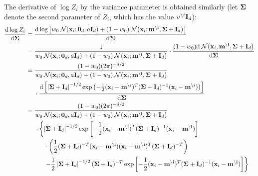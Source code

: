 \documentclass[11pt]{article}
\begin{document}
The derivative of $\log Z_i$ by the variance parameter is obtained 
similarly (let $\mathbf{\Sigma}$ denote the second parameter of $Z_i$, which has 
the value $v^{\setminus i}\mathbf{I}_d$):
\begin{align}
\frac{\byd \log Z_i}{\byd \vek{\Sigma}} &=
			\frac{\byd \log\left[ w_0  \norm(\vek{x}_i; \vek{0}_d, a\unity_{d})
			+  (1 - w_0)\norm\!\left(\vek{x}_i; \vek{m^{\setminus i}}, \vek{\Sigma} 
			+ \unity_d\right)
			\right]}{\byd \vek{\Sigma}} \\
			&=
			\frac{1}{w_0  \norm(\vek{x}_i; \vek{0}_d, a\unity_{d})
			+  (1 - w_0)\norm\!\left(\vek{x}_i; \vek{m^{\setminus i}}, \vek{\Sigma} 
			+ \unity_d\right)
			}%
			\cdot
			\frac{(1 - w_0)\byd
			\norm\!\left(\vek{x}_i; \vek{m^{\setminus i}}, \vek{\Sigma} + \unity_d\right)
			}{\byd \vek{\Sigma}} \\
			&=
			\frac{(1 - w_0)
				(2\pi)^{-d/2}}
			{w_0  \norm(\vek{x}_i; \vek{0}_d, a\unity_{d})
			+  (1 - w_0)\norm\!\left(\vek{x}_i; \vek{m^{\setminus i}}, \vek{\Sigma} 
			+ \unity_d\right)
			}\notag\\
		&\hphantom{=|}\mbox{}
			\cdot
			\frac{
			\byd\left[
			\left|\vek{\Sigma} + \unity_d\right|^{-1/2}
			\exp\left(-\frac{1}{2}
				(\vek{x}_i - \vek{m}^{\setminus i})^T
				(\vek{\Sigma} + \unity_d)^{-1}
				(\vek{x}_i - \vek{m}^{\setminus i})\right)\right]}
				{\byd \vek{\Sigma}} \\
			&=
			\frac{(1 - w_0)
				(2\pi)^{-d/2}}
			{w_0  \norm(\vek{x}_i; \vek{0}_d, a\unity_{d})
			+  (1 - w_0)\norm\!\left(\vek{x}_i; \vek{m^{\setminus i}}, \vek{\Sigma} 
			+ \unity_d\right)
			}\notag\\
			&\hphantom{=|}\mbox{}\cdot\left\{
     \left|\vek{\Sigma} + \unity_d\right|^{-1/2}%
						\exp\left[-\frac{1}{2}(\vek{x}_i - \vek{m^{\setminus 
				i}})^T(\vek{\Sigma} + \unity_d)^{-1}(\vek{x}_i - \vek{m^{\setminus 
				i}})\right]\right.\notag\\%
			&\hphantom{=|\cdot\Bigg\{}\mbox{}
				\cdot\left(\frac{1}{2}(\vek{\Sigma} + \unity_d)^{-T}(\vek{x}_i - \vek{m^{\setminus 
				i}})(\vek{x}_i - \vek{m^{\setminus i}})^T(\vek{\Sigma} + \unity_d)^{-T}\right)
				\notag\\
			&\hphantom{=|\cdot\Bigg\{}\mbox{}\left.
					- \frac{1}{2}\left|\vek{\Sigma} + \unity_d\right|^{-1/2}
					(\vek{\Sigma} + \unity_d)^{-T}
					\exp\left[-\frac{1}{2}(\vek{x}_i - \vek{m^{\setminus i}})^T(\vek{\Sigma} + \unity_d)^{-1}
										 (\vek{x}_i - \vek{m^{\setminus i}})\right]\right\}\\

\end{align}
\end{document}
